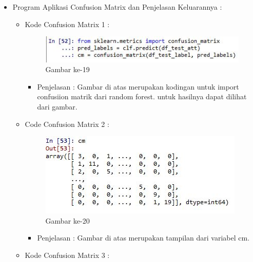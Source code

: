 \begin{enumerate}
\begin{itemize}
\begin{itemize}
\par
\par
\item Program Aplikasi Confusion Matrix dan Penjelasan Keluarannya :
\begin{itemize}
\item Kode Confusion Matrix 1 :
\par
\begin{figure}[ht]
\centering
\includegraphics[scale=0.7]{figures/hmm/cod19.jpg}
\caption{Gambar ke-19}
\label{contoh}
\end{figure}
\par
\begin{itemize}
\item Penjelasan :  Gambar di atas merupakan kodingan untuk import confusiion matrik dari random forest. untuk hasilnya dapat dilihat dari gambar.
\par 
\par
\end{itemize}
\item Code Confusion Matrix 2 :
\par
\begin{figure}[ht]
\centering
\includegraphics[scale=0.7]{figures/hmm/cod20.jpg}
\caption{Gambar ke-20}
\label{contoh}
\end{figure}
\par
\begin{itemize}
\item Penjelasan : Gambar di atas merupakan tampilan dari variabel cm.
\par
\par
\end{itemize}
\item Kode Confusion Matrix 3 :
\par
\begin{figure}[ht]
\centering

\end{figure}
\end{itemize}
\end{itemize}
\end{itemize}
\end{enumerate}

